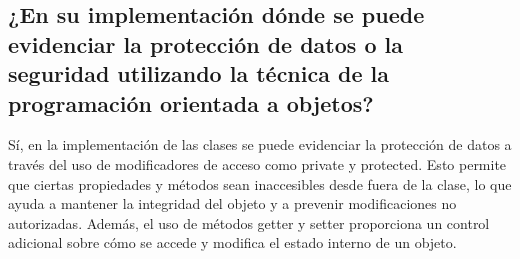 \subsection{¿En su implementación dónde se puede evidenciar la protección de datos o la seguridad utilizando la técnica de la programación orientada a objetos?}

Sí, en la implementación de las clases se puede evidenciar la protección de datos a través del uso de modificadores de acceso como private y protected. Esto permite que ciertas propiedades y métodos sean inaccesibles desde fuera de la clase, lo que ayuda a mantener la integridad del objeto y a prevenir modificaciones no autorizadas. Además, el uso de métodos getter y setter proporciona un control adicional sobre cómo se accede y modifica el estado interno de un objeto.




